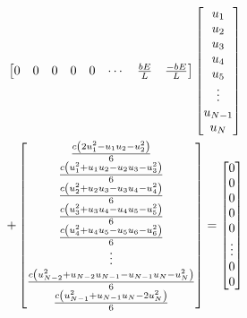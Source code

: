\begin{multline}
\begin{bmatrix}
    0 & 0 & 0 & 0 & 0 & \cdots & \frac{bE}{L} & \frac{-bE}{L} \\
  \end{bmatrix} \begin{bmatrix}
    u_{1} \\
    u_{2} \\
    u_{3} \\
    u_{4} \\
    u_{5} \\
    \vdots \\
    u_{N-1} \\
    u_{N}
  \end{bmatrix} \\
  + \begin{bmatrix}
    \frac{c\left( 2 u_{1}^{2}-u_{1}u_{2}-u_{2}^{2} \right)}{6} \\
    \frac{c\left( u_{1}^{2}+u_{1}u_{2}-u_{2}u_{3}-u_{3}^{2} \right)}{6} \\
    \frac{c\left( u_{2}^{2}+u_{2}u_{3}-u_{3}u_{4}-u_{4}^{2} \right)}{6} \\
    \frac{c\left( u_{3}^{2}+u_{3}u_{4}-u_{4}u_{5}-u_{5}^{2} \right)}{6} \\
    \frac{c\left( u_{4}^{2}+u_{4}u_{5}-u_{5}u_{6}-u_{6}^{2} \right)}{6} \\
    \vdots \\
    \frac{c\left( u_{N-2}^{2}+u_{N-2}u_{N-1}-u_{N-1}u_{N}-u_{N}^{2} \right)}{6} \\
    \frac{c\left( u_{N-1}^{2}+u_{N-1}u_{N}-2u_{N}^{2} \right)}{6}    
  \end{bmatrix} = \begin{bmatrix}
    0 \\
    0 \\
    0 \\
    0 \\
    0 \\
    \vdots \\
    0 \\
    0 \\
  \end{bmatrix}
\end{multline}

